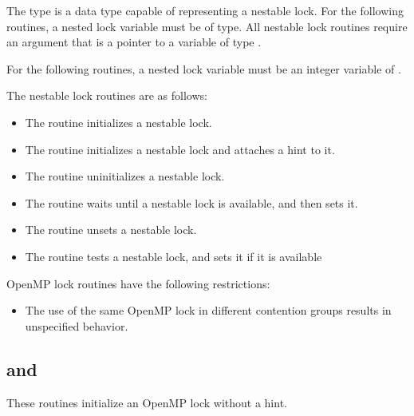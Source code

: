 \ccppspecificstart
The type  is a data type capable of representing a nestable lock. 
For the following routines, a nested lock variable must be of  type. 
All nestable lock routines require an argument that is a pointer to a variable of type 
.
\ccppspecificend

\fortranspecificstart
For the following routines, a nested lock variable must be an integer variable of 
.
\fortranspecificend

The nestable lock routines are as follows:

\begin{itemize}
\item The  routine initializes a nestable lock.

\item The  routine initializes a nestable lock and attaches a hint to it.

\item The  routine uninitializes a nestable lock.

\item The  routine waits until a nestable lock is available, and then 
sets it.

\item The  routine unsets a nestable lock.

\item The  routine tests a nestable lock, and sets it if it is 
available
\end{itemize}

\restrictions
OpenMP lock routines have the following restrictions:

\begin{itemize}
\item The use of the same OpenMP lock in different contention groups results in 
unspecified behavior. 
\end{itemize}










\subsection{ and }
\label{subsec:omp_init_lock and omp_init_nest_lock}
\summary
These routines initialize an OpenMP lock without a hint.

